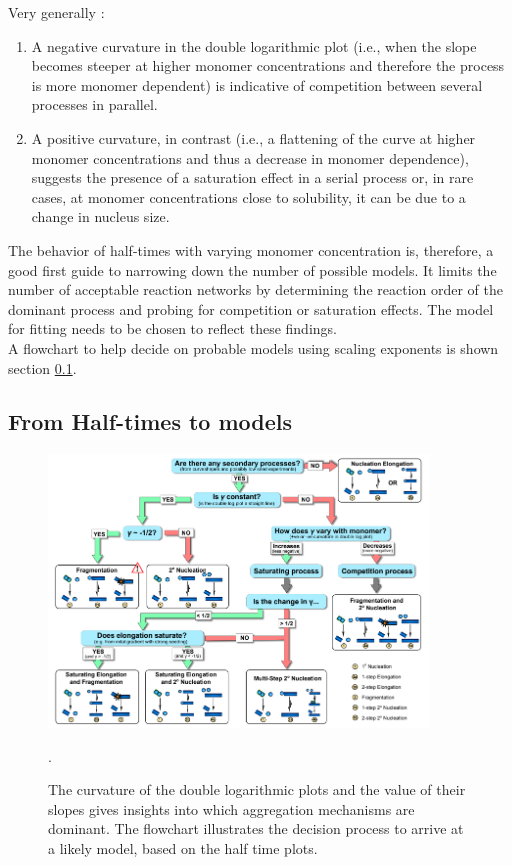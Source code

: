 \documentclass[11pt,a4paper]{article}
\begin{document}
Very generally :
\begin{enumerate}
\item A negative curvature in the double logarithmic plot (i.e., when the slope becomes steeper at higher
monomer concentrations and therefore the process is more monomer dependent) is indicative of competition between several
processes in parallel.
\item A positive curvature, in contrast (i.e., a flattening of the curve at higher monomer concentrations and thus
a decrease in monomer dependence), suggests the presence of a saturation effect in a serial process  or, in rare cases, at monomer concentrations close to solubility, it can be due to a change in nucleus size.
\end{enumerate}
The behavior of half-times with varying monomer concentration is, therefore, a good first guide to narrowing down the number of possible models. It limits the number of acceptable reaction networks by determining the reaction order of the dominant process and probing for competition or saturation effects. The model for fitting needs to be chosen to reflect these findings. \\
A flowchart to help decide on probable models using scaling exponents is shown section \ref{half-times}.

\subsection{From Half-times to models}\label{half-times} \cite{meisl_molecular_2016}
\begin{figure}[H]
\centering
\includegraphics[width=0.9\textwidth]{Images/half_times_to_models.png}
\caption{The curvature of the double logarithmic plots and the value of their slopes gives insights into which aggregation mechanisms are dominant. The flowchart illustrates the decision process to arrive at a likely model, based on the half time plots.}
\label{fig: sample trajectory}.
\end{figure}
\end{document}
